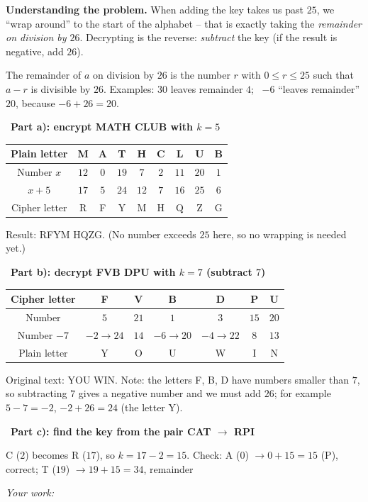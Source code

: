 \documentclass[11pt]{article}
\newif\ifsol \solfalse
\newcommand{\StuProb}[2]{\begin{probboxS}{#1}{#2}\StuProbBody\end{probboxS}}
\newcommand{\probsol}[1]{%
  \begin{lrbox}{\solmeasure}\begin{minipage}{\dimexpr\linewidth-24pt\relax}#1\end{minipage}\end{lrbox}%
  \ifsol
    \begin{solbox}#1\end{solbox}%
  \else
    \setlength{\solht}{\dimexpr\ht\solmeasure+\dp\solmeasure+0.85cm\relax}%
    \ifdim\solht<1.35cm\setlength{\solht}{1.35cm}\fi
    \ifdim\solht>\StudentMaxWork\setlength{\solht}{\StudentMaxWork}\fi
    \par\noindent\begin{minipage}{\linewidth}%
    \expandafter\StuProb\StuProbArgs
    \begin{tcolorbox}[colback=white,colframe=Line,boxrule=0.8pt,arc=5pt,
      left=8pt,right=8pt,top=4pt,bottom=4pt,height=\solht]{\footnotesize\color{Slate}\itshape\WorkWord}\end{tcolorbox}%
    \end{minipage}\par\medskip
  \fi}
\newlength{\StudentMaxWork}\setlength{\StudentMaxWork}{4.5cm}
\newcommand{\step}[2]{\par\smallskip\noindent{\bfseries\color{tmBlue!85!black}\StepWord~#1.}\ {\bfseries #2}\par\nopagebreak}
\def\WorkWord{Your work:}
\def\StepWord{Step}
\begin{document}
\probsol{
\textbf{Understanding the problem.} When adding the key takes us past $25$, we ``wrap around'' to the start of the alphabet -- that is
exactly taking the \emph{remainder on division by $26$}. Decrypting is the reverse: \emph{subtract} the key (if the result is
negative, add $26$).
\begin{recallbox}The remainder of $a$ on division by $26$ is the number $r$ with $0 \le r \le 25$ such that $a - r$ is divisible by
$26$. Examples: $30$ leaves remainder $4$; \ $-6$ ``leaves remainder'' $20$, because $-6 + 26 = 20$.\end{recallbox}
\step{1}{Part a): encrypt \textsf{MATH CLUB} with $k = 5$}
\begin{center}\small
\begin{tabular}{|c|c|c|c|c|c|c|c|c|}
\hline
\rowcolor{tmBlue!10} Plain letter & M & A & T & H & C & L & U & B\\ \hline
Number $x$ & $12$ & $0$ & $19$ & $7$ & $2$ & $11$ & $20$ & $1$\\ \hline
$x + 5$ & $17$ & $5$ & $24$ & $12$ & $7$ & $16$ & $25$ & $6$\\ \hline
Cipher letter & R & F & Y & M & H & Q & Z & G\\ \hline
\end{tabular}
\end{center}
Result: \textsf{RFYM HQZG}. (No number exceeds $25$ here, so no wrapping is needed yet.)
\step{2}{Part b): decrypt \textsf{FVB DPU} with $k = 7$ (subtract $7$)}
\begin{center}\small
\begin{tabular}{|c|c|c|c|c|c|c|}
\hline
\rowcolor{tmBlue!10} Cipher letter & F & V & B & D & P & U\\ \hline
Number & $5$ & $21$ & $1$ & $3$ & $15$ & $20$\\ \hline
Number $- 7$ & $-2 \to 24$ & $14$ & $-6 \to 20$ & $-4 \to 22$ & $8$ & $13$\\ \hline
Plain letter & Y & O & U & W & I & N\\ \hline
\end{tabular}
\end{center}
Original text: \textsf{YOU WIN}. Note: the letters F, B, D have numbers smaller than $7$, so subtracting $7$ gives a negative number
and we must add $26$; for example $5 - 7 = -2$, $-2 + 26 = 24$ (the letter Y).
\step{3}{Part c): find the key from the pair \textsf{CAT} $\to$ \textsf{RPI}}
C ($2$) becomes R ($17$), so $k = 17 - 2 = 15$. Check: A ($0$) $\to 0 + 15 = 15$ (P), correct; T ($19$) $\to 19 + 15 = 34$, remainder
}
\end{document}
